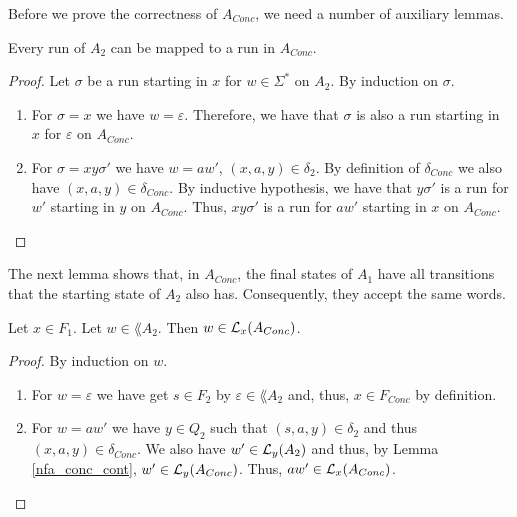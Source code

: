 
Before we prove the correctness of $A_{Conc}$, we need a number of auxiliary lemmas.

\begin{lemma}
    \label{nfa_conc_cont}
    Every run of $A_2$ can be mapped to a run in $A_{Conc}$.
\end{lemma}
\begin{proof}
    Let $\sigma$ be a run starting in $x$ for $w \in \Sigma^*$ on $A_2$.
    By induction on $\sigma$.
    \begin{enumerate}
        \item 
            For $\sigma = x$
            we have $w = \varepsilon$.
            Therefore, we have that $\sigma$ is also a run starting in $x$ for $\varepsilon$ on $A_{Conc}$.
        \item
            For $\sigma = xy\sigma'$ we have $w = aw'$, $(x, a, y) \in \delta_2$.
            By definition of $\delta_{Conc}$ we also have $(x, a, y) \in \delta_{Conc}$.
            By inductive hypothesis, we have that $y\sigma'$ is a run for $w'$ starting in $y$ on $A_{Conc}$.
            Thus, $xy\sigma'$ is a run for $aw'$ starting in $x$ on $A_{Conc}$.
    \end{enumerate}
\end{proof}


The next lemma shows that, in $A_{Conc}$, the final states of $A_1$ have all transitions that the starting state of $A_2$ also has.
Consequently, they accept the same words.

\begin{lemma}
    \label{nfa_conc_fin1}
    Let $x \in F_1$. Let $w \in \lang{A_2}$. Then $w \in \mathcal{L}_{x}(A_{Conc})$.
\end{lemma}
\begin{proof}
    By induction on $w$. 
    \begin{enumerate}
        \item For $w = \varepsilon$ we have get $s \in F_2$ by $\varepsilon \in \lang{A_2}$ and, thus, $x \in F_{Conc}$ by definition.
        \item For $w = aw'$ we have $y \in Q_2$ such that $(s,a,y) \in \delta_2$ and thus $(x,a,y) \in \delta_{Conc}$.
            We also have $w' \in \mathcal{L}_{y}(A_2)$ and thus, by Lemma \ref{nfa_conc_cont}, $w' \in \mathcal{L}_{y}(A_{Conc})$.
            Thus, $aw' \in \mathcal{L}_{x}(A_{Conc})$.
    \end{enumerate}
\end{proof}

